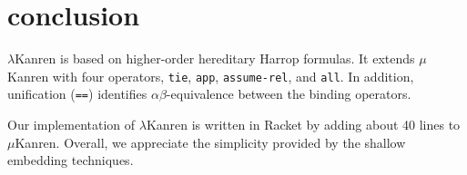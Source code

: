 \documentclass[acmlarge,review]{acmart}
\theoremstyle{definition}
\begin{document}
\section{conclusion}
$\lambda$Kanren is based on higher-order hereditary Harrop formulas.
It extends $\mu$Kanren with four operators, \texttt{tie},
\texttt{app}, \texttt{assume-rel}, and \texttt{all}. In addition, unification
(\texttt{==}) identifies $\alpha\beta$-equivalence between the binding
operators.

Our implementation of $\lambda$Kanren is written in Racket by adding
about 40 lines to $\mu$Kanren. Overall, we appreciate the simplicity
provided by the shallow embedding techniques.



\end{document}
